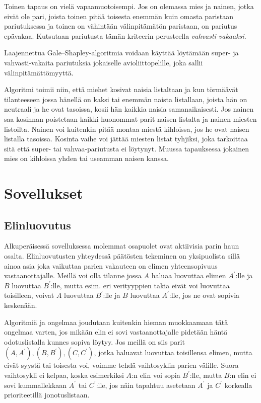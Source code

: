 \documentclass[finnish]{tktltiki2}
\theoremstyle{definition}
\theoremstyle{remark}
\begin{document}
Toinen tapaus on vielä vapaamuotoisempi. Jos on olemassa mies ja nainen, jotka eivät ole pari, joista toinen pitää toisesta enemmän kuin omasta paristaan pariutuksessa ja toinen on vähintään välinpitämätön paristaan, on pariutus epävakaa. Kutsutaan pariutusta tämän kriteerin perusteella \emph{vahvasti-vakaaksi}.

Laajennettua Gale--Shapley-algoritmia voidaan käyttää löytämään super- ja vahvasti-vakaita pariutuksia jokaiselle avioliittopelille, joka sallii välinpitämättömyyttä.

Algoritmi toimii niin, että miehet kosivat naisia listaltaan ja kun törmäävät tilanteeseen jossa hänellä on kaksi tai enemmän naista listallaan, joista hän on neutraali ja he ovat tasoissa, kosii hän kaikkia naisia samanaikaisesti. Jos nainen saa kosinnan poistetaan kaikki huonommat parit naisen listalta ja nainen miesten listoilta. Nainen voi kuitenkin pitää montaa miestä kihloissa, jos he ovat naisen listalla tasoissa. Kosinta vaihe voi jättää miesten listat tyhjiksi, joka tarkoittaa sitä että super- tai vahvaa-pariutusta ei löytynyt. Muussa tapauksessa jokainen mies on kihloissa yhden tai useamman naisen kanssa.

\section{Sovellukset}
\subsection{Elinluovutus}
Alkuperäisessä sovelluksessa molemmat osapuolet ovat aktiivisia parin haun osalta. Elinluovutusten yhteydessä päätösten tekeminen on yksipuolista sillä ainoa asia joka vaikuttaa parien vakauteen on elimen yhteensopivuus vastaanottajalle. Meillä voi olla tilanne jossa $A$ haluaa luovuttaa elimen $A^{'}$:lle ja $B$ luovuttaa $B^{'}$:lle, mutta esim. eri verityyppien takia eivät voi luovuttaa toisilleen, voivat $A$ luovuttaa $B^{'}$:lle ja $B$ luovuttaa $A^{'}$:lle, jos ne ovat sopivia keskenään.

Algoritmiä ja ongelmaa joudutaan kuitenkin hieman muokkaamaan tätä ongelmaa varten, jos mikään elin ei sovi vastaanottajalle pidetään häntä odotuslistalla kunnes sopiva löytyy. Jos meillä on siis parit $(A, A^{'}), (B, B^{'}), (C, C^{'})$, jotka haluavat luovuttaa toisillensa elimen, mutta eivät syystä tai toisesta voi, voimme tehdä vaihtosyklin parien välille. Suora vaihtosykli ei kelpaa, koska esimerkiksi $A$:n elin voi sopia $B^{'}$:lle, mutta $B$:n elin ei sovi kummallekkaan $A^{'}$ tai $C^{'}$:lle, jos näin tapahtuu asetetaan $A^{'}$ ja $C^{'}$ korkealla prioriteetillä jonotuslistaan.
\end{document}

